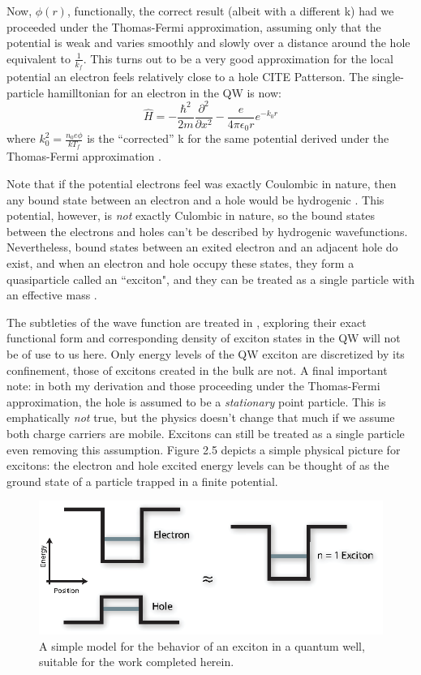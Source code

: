 \indent Now, $\phi(r)$, functionally,  the correct result (albeit with a different k) had we proceeded under the Thomas-Fermi approximation, assuming only that the potential is weak and varies smoothly and slowly over a distance around the hole equivalent to $\frac{1}{k_f}$. This turns out to be a very good approximation for the local potential an electron feels relatively close to a hole CITE Patterson. The single-particle hamilltonian for an electron in the QW is now:
\begin{equation}
\hat{H} = - \frac{\hbar^2}{2m} \frac{\partial^2}{\partial x^2} - \frac{e}{4\pi \epsilon_0 r} e^{-k_0 r}
\end{equation}
where $k_0^2 = \frac{n_0 e\phi}{k T_f}$ is the ``corrected'' k for the same potential derived under the Thomas-Fermi approximation \cite{patterson}. 

\indent Note that if the potential electrons feel was exactly Coulombic in nature, then any bound state between an electron and a hole would be hydrogenic \cite{griffiths}. This potential, however, is \textit{not} exactly Culombic in nature, so the bound states between the electrons and holes can't be described by hydrogenic wavefunctions. Nevertheless, bound states between an exited electron and an adjacent hole do exist, and when an electron and hole occupy these states, they form a quasiparticle called an ``exciton", and they can be treated as a single particle with an effective mass \cite{iadonisi, davies}.

\indent The subtleties of the wave function are treated in \cite{iadonisi}, exploring their exact functional form and corresponding density of exciton states in the QW will not be of use to us here. Only energy levels of the QW exciton are discretized by its confinement, those of excitons created in the bulk are not. A final important note: in both my derivation and those proceeding under the Thomas-Fermi approximation, the hole is assumed to be a \textit{stationary} point particle. This is emphatically \textit{not} true, but the physics doesn't change that much if we assume both charge carriers are mobile. Excitons can still be treated as a single particle even removing this assumption. Figure 2.5 depicts a simple physical picture for excitons: the electron and hole excited energy levels can be thought of as the ground state of a particle trapped in a finite potential.  

\begin{figure}[h!]
\label{Spapprox}
\centering
\includegraphics[width = .7\textwidth]{SpApprox.eps}
\caption{\doublespacing A simple model for the behavior of an exciton in a quantum well, suitable for the work completed herein.}
\label{GaAsBstruct}
\end{figure}


